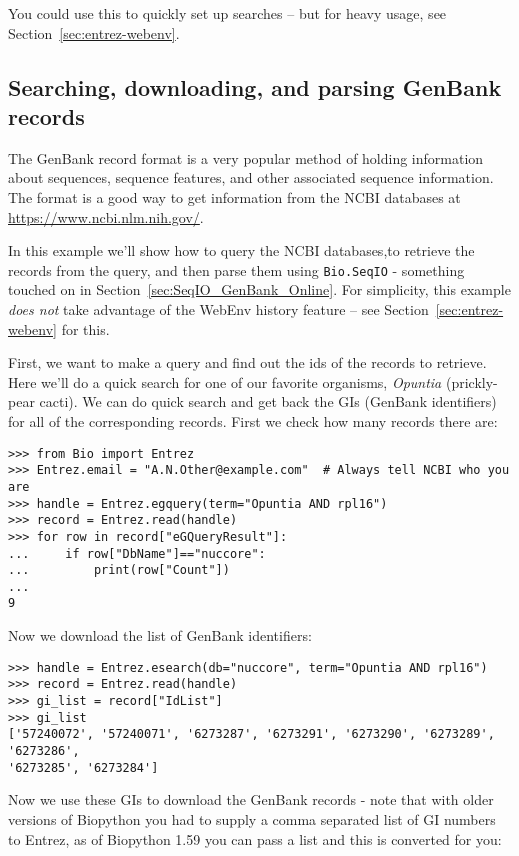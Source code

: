 You could use this to quickly set up searches -- but for heavy usage, see Section~\ref{sec:entrez-webenv}.

\subsection{Searching, downloading, and parsing GenBank records}
\label{sec:entrez-search-fetch-genbank}

The GenBank record format is a very popular method of holding information about sequences, sequence features, and other associated sequence information. The format is a good way to get information from the NCBI databases at \url{https://www.ncbi.nlm.nih.gov/}.

In this example we'll show how to query the NCBI databases,to retrieve the records from the query, and then parse them using \verb+Bio.SeqIO+  - something touched on in Section~\ref{sec:SeqIO_GenBank_Online}.
For simplicity, this example \emph{does not} take advantage of the WebEnv history feature -- see Section~\ref{sec:entrez-webenv} for this.

First, we want to make a query and find out the ids of the records to retrieve. Here we'll do a quick search for one of our favorite organisms, \emph{Opuntia} (prickly-pear cacti). We can do quick search and get back the GIs (GenBank identifiers) for all of the corresponding records. First we check how many records there are:

\begin{verbatim}
>>> from Bio import Entrez
>>> Entrez.email = "A.N.Other@example.com"  # Always tell NCBI who you are
>>> handle = Entrez.egquery(term="Opuntia AND rpl16")
>>> record = Entrez.read(handle)
>>> for row in record["eGQueryResult"]:
...     if row["DbName"]=="nuccore":
...         print(row["Count"])
...
9
\end{verbatim}
Now we download the list of GenBank identifiers:
\begin{verbatim}
>>> handle = Entrez.esearch(db="nuccore", term="Opuntia AND rpl16")
>>> record = Entrez.read(handle)
>>> gi_list = record["IdList"]
>>> gi_list
['57240072', '57240071', '6273287', '6273291', '6273290', '6273289', '6273286',
'6273285', '6273284']
\end{verbatim}

Now we use these GIs to download the GenBank records - note that with older versions of Biopython you had to supply a comma separated list of GI numbers to Entrez, as of Biopython 1.59 you can pass a list and this is converted for you:

